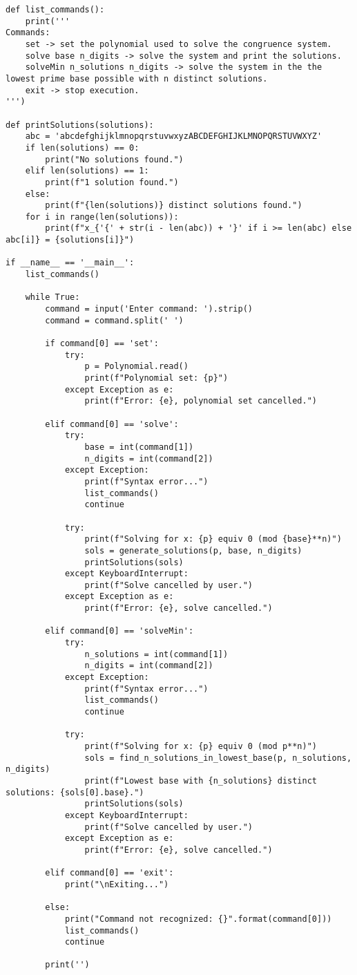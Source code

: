 \documentclass{report}
\begin{document}
\begin{verbatim}
def list_commands():
    print('''
Commands:
    set -> set the polynomial used to solve the congruence system.
    solve base n_digits -> solve the system and print the solutions.
    solveMin n_solutions n_digits -> solve the system in the the lowest prime base possible with n distinct solutions.
    exit -> stop execution.
''')

def printSolutions(solutions):
    abc = 'abcdefghijklmnopqrstuvwxyzABCDEFGHIJKLMNOPQRSTUVWXYZ'
    if len(solutions) == 0:
        print("No solutions found.")
    elif len(solutions) == 1:
        print(f"1 solution found.")
    else:
        print(f"{len(solutions)} distinct solutions found.")
    for i in range(len(solutions)):
        print(f"x_{'{' + str(i - len(abc)) + '}' if i >= len(abc) else abc[i]} = {solutions[i]}")

if __name__ == '__main__':
    list_commands()
    
    while True:
        command = input('Enter command: ').strip()
        command = command.split(' ')

        if command[0] == 'set':
            try:
                p = Polynomial.read()
                print(f"Polynomial set: {p}")
            except Exception as e:
                print(f"Error: {e}, polynomial set cancelled.")
        
        elif command[0] == 'solve':
            try:
                base = int(command[1])
                n_digits = int(command[2])
            except Exception:
                print(f"Syntax error...")
                list_commands()
                continue

            try:
                print(f"Solving for x: {p} equiv 0 (mod {base}**n)")
                sols = generate_solutions(p, base, n_digits)
                printSolutions(sols)
            except KeyboardInterrupt:
                print(f"Solve cancelled by user.")
            except Exception as e:
                print(f"Error: {e}, solve cancelled.")
        
        elif command[0] == 'solveMin':
            try:
                n_solutions = int(command[1])
                n_digits = int(command[2])
            except Exception:
                print(f"Syntax error...")
                list_commands()
                continue

            try:
                print(f"Solving for x: {p} equiv 0 (mod p**n)")
                sols = find_n_solutions_in_lowest_base(p, n_solutions, n_digits)
                print(f"Lowest base with {n_solutions} distinct solutions: {sols[0].base}.")
                printSolutions(sols)
            except KeyboardInterrupt:
                print(f"Solve cancelled by user.")
            except Exception as e:
                print(f"Error: {e}, solve cancelled.")
        
        elif command[0] == 'exit':
            print("\nExiting...")

        else:
            print("Command not recognized: {}".format(command[0]))
            list_commands()
            continue

        print('')

\end{verbatim}
\end{document}

